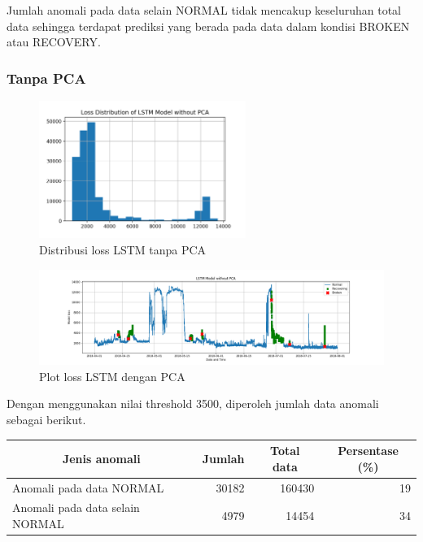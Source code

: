     Jumlah anomali pada data selain NORMAL tidak mencakup keseluruhan total data sehingga terdapat prediksi yang berada pada data dalam kondisi BROKEN atau RECOVERY.

    \subsubsection{Tanpa PCA}

    \begin{figure}[h]
        \centering
        \includegraphics[width=0.6\textwidth]{resources/LSTM/LSTM_noPCA_LossDist.png}
        \caption{Distribusi loss LSTM tanpa PCA}
    \end{figure}

    \begin{figure}[h]
        \centerline{\includegraphics[width=1.4\textwidth]{resources/LSTM/LSTM_noPCA_model_loss.png}}
        \caption{Plot loss LSTM dengan PCA}
    \end{figure}

    Dengan menggunakan nilai threshold 3500, diperoleh jumlah data anomali sebagai berikut.

    \begin{table}[h]
        \centering
        \begin{tabular}{|l|r|r|r|}
            \hline
            \multicolumn{1}{|c|}{\textbf{Jenis anomali}} & \multicolumn{1}{c|}{\textbf{Jumlah}} & \multicolumn{1}{c|}{\textbf{Total data}} & \multicolumn{1}{c|}{\textbf{Persentase (\%)}} \\ \hline
            Anomali pada data NORMAL                     & 30182                                & 160430                                   & 19                                       \\ \hline
            Anomali pada data selain NORMAL              & 4979                                 & 14454                                    & 34                                       \\ \hline
        \end{tabular}
    \end{table}

